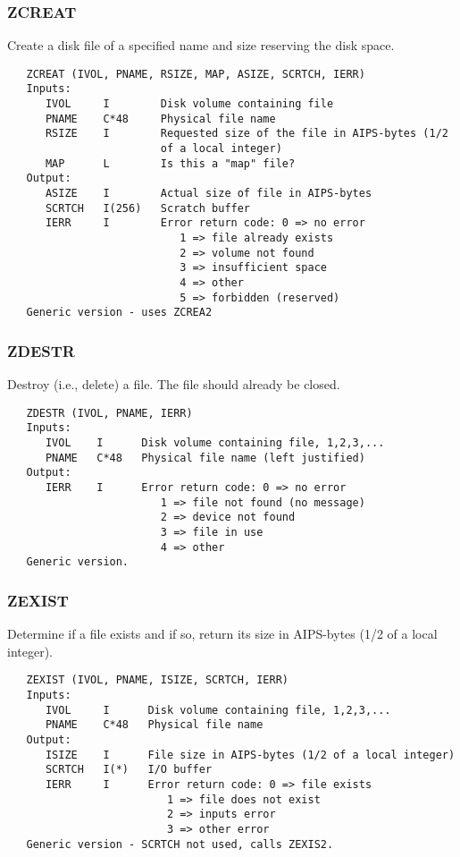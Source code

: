 \subsubsection{ZCREAT}
Create a disk file of a specified name and size reserving the
disk space.
\begin{verbatim}
   ZCREAT (IVOL, PNAME, RSIZE, MAP, ASIZE, SCRTCH, IERR)
   Inputs:
      IVOL     I        Disk volume containing file
      PNAME    C*48     Physical file name
      RSIZE    I        Requested size of the file in AIPS-bytes (1/2
                        of a local integer)
      MAP      L        Is this a "map" file?
   Output:
      ASIZE    I        Actual size of file in AIPS-bytes
      SCRTCH   I(256)   Scratch buffer
      IERR     I        Error return code: 0 => no error
                           1 => file already exists
                           2 => volume not found
                           3 => insufficient space
                           4 => other
                           5 => forbidden (reserved)
   Generic version - uses ZCREA2
\end{verbatim}

\subsubsection{ZDESTR}
Destroy (i.e., delete) a file.  The file should already be closed.
\begin{verbatim}
   ZDESTR (IVOL, PNAME, IERR)
   Inputs:
      IVOL    I      Disk volume containing file, 1,2,3,...
      PNAME   C*48   Physical file name (left justified)
   Output:
      IERR    I      Error return code: 0 => no error
                        1 => file not found (no message)
                        2 => device not found
                        3 => file in use
                        4 => other
   Generic version.
\end{verbatim}

\subsubsection{ZEXIST}
Determine if a file exists and if so, return its size in AIPS-bytes
(1/2 of a local integer).
\begin{verbatim}
   ZEXIST (IVOL, PNAME, ISIZE, SCRTCH, IERR)
   Inputs:
      IVOL     I      Disk volume containing file, 1,2,3,...
      PNAME    C*48   Physical file name
   Output:
      ISIZE    I      File size in AIPS-bytes (1/2 of a local integer)
      SCRTCH   I(*)   I/O buffer
      IERR     I      Error return code: 0 => file exists
                         1 => file does not exist
                         2 => inputs error
                         3 => other error
   Generic version - SCRTCH not used, calls ZEXIS2.
\end{verbatim}

